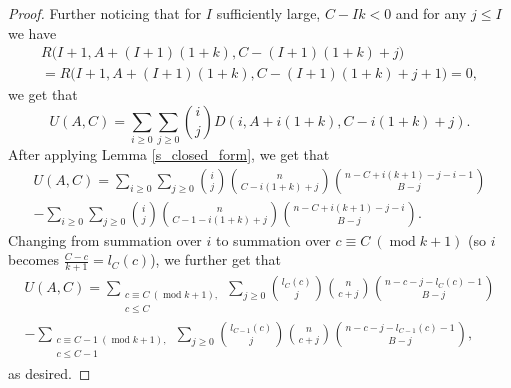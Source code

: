 \documentclass[11pt, reqno]{amsart}
\numberwithin{equation}{section}
\newcommand\modd{\operatorname{mod}}
\begin{document}
\begin{proof}
    Further noticing that for $I$ sufficiently large, $C- Ik < 0$ and for any $j \leqslant I$ we have
    \begin{multline*}
        R\Big(I+1, A+(I+1)(1+k), C-(I+1)(1+k)+j\Big)\\ = R\Big(I+1, A+(I+1)(1+k), C-(I+1)(1+k)+j+1\Big) = 0,
    \end{multline*}
    we get that
    \begin{equation*}
        U(A, C) = \sum_{i \geqslant 0} \sum_{j \geqslant 0} \binom{i}{j} D(i, A+i(1+k), C-i(1+k)+j).
    \end{equation*}
    After applying Lemma \ref{s_closed_form}, we get that
    \begin{multline*}
        U(A, C) = \sum_{i \geqslant 0} \sum_{j \geqslant 0} \binom{i}{j} \binom{n}{C-i(1+k)+j} \binom{n-C+i(k+1)-j-i-1}{B-j}\\ - \sum_{i \geqslant 0} \sum_{j \geqslant 0} \binom{i}{j} \binom{n}{C-1-i(1+k)+j} \binom{n-C+i(k+1)-j-i}{B-j}.
    \end{multline*}
    Changing from summation over $i$ to summation over $c \equiv C \ (\modd k+1)$ (so $i$ becomes $\frac{C-c}{k+1}=l_C(c)$), we further get that
    \begin{multline*}
        U(A, C) = \sum_{\substack{c \equiv C \ (\modd k+1), \\ c \leqslant C}} \sum_{j \geqslant 0} \binom{l_C(c)}{j} \binom{n}{c+j} \binom{n-c-j-l_C(c)-1}{B-j}\\ - \sum_{\substack{c \equiv C-1 \ (\modd k+1), \\ c \leqslant C-1}} \sum_{j \geqslant 0} \binom{l_{C-1}(c)}{j} \binom{n}{c+j} \binom{n-c-j-l_{C-1}(c)-1}{B-j},
    \end{multline*}
    as desired.


\end{proof}
\end{document}
